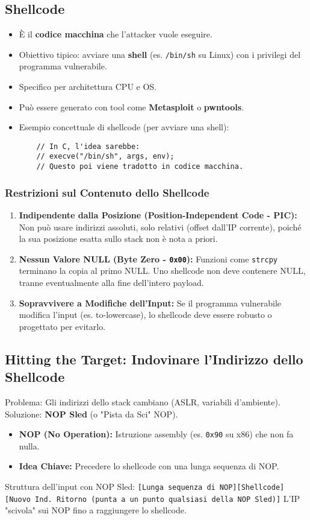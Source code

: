 \subsection{Shellcode}
\begin{itemize}
    \item È il \textbf{codice macchina} che l'attacker vuole eseguire.
    \item Obiettivo tipico: avviare una \textbf{shell} (es. \texttt{/bin/sh} su Linux) con i privilegi del programma vulnerabile.
    \item Specifico per architettura CPU e OS.
    \item Può essere generato con tool come \textbf{Metasploit} o \textbf{pwntools}.
    \item Esempio concettuale di shellcode (per avviare una shell):
    \begin{verbatim}
    // In C, l'idea sarebbe:
    // execve("/bin/sh", args, env);
    // Questo poi viene tradotto in codice macchina.
    \end{verbatim}
\end{itemize}

\subsubsection{Restrizioni sul Contenuto dello Shellcode}
\begin{enumerate}
    \item \textbf{Indipendente dalla Posizione (Position-Independent Code - PIC):}
    Non può usare indirizzi assoluti, solo relativi (offset dall'IP corrente), poiché la sua posizione esatta sullo stack non è nota a priori.
    \item \textbf{Nessun Valore NULL (Byte Zero - \texttt{0x00}):}
    Funzioni come \texttt{strcpy} terminano la copia al primo NULL. Uno shellcode non deve contenere NULL, tranne eventualmente alla fine dell'intero payload.
    \item \textbf{Sopravvivere a Modifiche dell'Input:}
    Se il programma vulnerabile modifica l'input (es. to-lowercase), lo shellcode deve essere robusto o progettato per evitarlo.
\end{enumerate}

\subsection{Hitting the Target: Indovinare l'Indirizzo dello Shellcode}
Problema: Gli indirizzi dello stack cambiano (ASLR, variabili d'ambiente).
Soluzione: \textbf{NOP Sled} (o "Pista da Sci" NOP).
\begin{itemize}
    \item \textbf{NOP (No Operation):} Istruzione assembly (es. \texttt{0x90} su x86) che non fa nulla.
    \item \textbf{Idea Chiave:} Precedere lo shellcode con una lunga sequenza di NOP.
\end{itemize}
Struttura dell'input con NOP Sled:
\texttt{[Lunga sequenza di NOP][Shellcode][Nuovo Ind. Ritorno (punta a un punto qualsiasi della NOP Sled)]}
L'IP "scivola" sui NOP fino a raggiungere lo shellcode.

